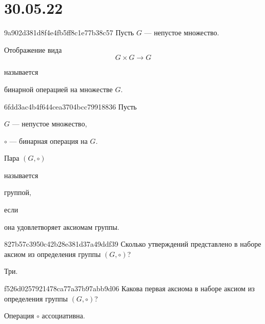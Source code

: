 


\section{30.05.22}
\begin{note}{9a902d381d8f4e4fb5ff8c1e77b38c57}
    Пусть \({ G }\) --- непустое множество.
    \begin{icloze}{1}
        Отображение вида
        \[
            G \times G \to G
        \]
    \end{icloze}
    называется \begin{icloze}{2}бинарной операцией на множестве \({ G }\).\end{icloze}
\end{note}

\begin{note}{6fdd3ac4b4f644cea3704bcc79918836}
    Пусть \begin{icloze}{1}\({ G }\) --- непустое множество,\end{icloze} \begin{icloze}{2}\({ \circ }\) --- бинарная операция на \({ G }\).\end{icloze}
    \begin{icloze}{4}Пара \({ (G, \circ) }\)\end{icloze} называется \begin{icloze}{3}группой,\end{icloze} если \begin{icloze}{4}она удовлетворяет аксиомам группы.\end{icloze}
\end{note}

\begin{note}{827b57c3950c42b28e381d37a49ddf39}
    Сколько утверждений представлено в наборе аксиом из определения группы \({ (G, \circ) }\)?

    \begin{cloze}{1}
        Три.
    \end{cloze}
\end{note}

\begin{note}{f526d0257921478ca77a37b97abb9d06}
    Какова первая аксиома в наборе аксиом из определения группы \({ (G, \circ) }\)?

    \begin{cloze}{1}
        Операция \({ \circ }\) ассоциативна.
    \end{cloze}
\end{note}

